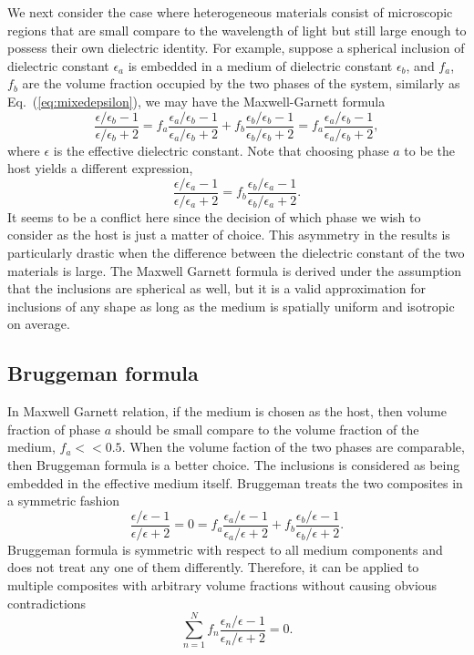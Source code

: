 We next consider the case where heterogeneous materials consist of microscopic regions that are small compare to the wavelength of light but still large enough to possess their own dielectric identity. For example, suppose a spherical inclusion of dielectric constant $\epsilon_a$ is embedded in a medium of dielectric constant $\epsilon_b$, and $f_a$, $f_b$ are the volume fraction occupied by the two phases of the system, similarly as Eq.~(\ref{eq:mixedepsilon}), we may have the Maxwell-Garnett formula \cite{garnett1904, garnett1906, choy99}
\begin{equation}
\label{eq:maxwellgarnett}
\frac{\epsilon/\epsilon_b - 1}{\epsilon/\epsilon_b + 2} = f_a \frac{\epsilon_a/\epsilon_b - 1}{\epsilon_a/\epsilon_b + 2} + f_b \frac{\epsilon_b/\epsilon_b - 1}{\epsilon_b/\epsilon_b + 2} = f_a \frac{\epsilon_a/\epsilon_b - 1}{\epsilon_a/\epsilon_b + 2},
\end{equation}
where $\epsilon$ is the effective dielectric constant. 
Note that choosing phase $a$ to be the host yields a different expression,
\begin{equation}
\frac{\epsilon/\epsilon_a - 1}{\epsilon/\epsilon_a + 2} = f_b \frac{\epsilon_b/\epsilon_a - 1}{\epsilon_b/\epsilon_a + 2}.
\end{equation}
It seems to be a conflict here since the decision of which phase we wish to consider as the host is just a matter of choice. This asymmetry in the results is particularly drastic when the difference between the dielectric constant of the two materials is large.  The Maxwell Garnett formula is derived under the assumption that the inclusions are spherical as well, but it is a valid approximation for inclusions of any shape as long as the medium is spatially uniform and isotropic on average.

\subsection{Bruggeman formula}

In Maxwell Garnett relation, if the medium is chosen as the host, then volume fraction of phase $a$ should be small compare to the volume fraction of the medium, $f_a << 0.5$. When the volume faction of the two phases are comparable, then Bruggeman formula is a better choice. The inclusions is considered as being embedded in the effective medium itself. Bruggeman treats the two composites in a symmetric fashion \cite{bruggeman35,choy99}
\begin{equation}
\label{eq:bruggeman}
\frac{\epsilon/\epsilon - 1}{\epsilon/\epsilon + 2} = 0 = f_a \frac{\epsilon_a/\epsilon - 1}{\epsilon_a/\epsilon + 2} + f_b \frac{\epsilon_b/\epsilon - 1}{\epsilon_b/\epsilon + 2}.
\end{equation}
Bruggeman formula is symmetric with respect to all medium components and does not treat any one of them differently. Therefore, it can be applied to multiple composites with arbitrary volume fractions without causing obvious contradictions \cite{markel16}
\begin{equation}
\sum \limits_{n=1}^N f_n \frac{\epsilon_n/\epsilon - 1}{\epsilon_n/\epsilon + 2} = 0.
\end{equation}


